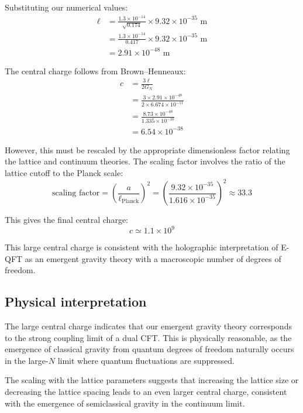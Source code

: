 Substituting our numerical values:
\begin{align}
\ell &= \frac{1.3 \times 10^{-14}}{\sqrt{0.174}} \times 9.32 \times 10^{-35} \text{ m} \\
&= \frac{1.3 \times 10^{-14}}{0.417} \times 9.32 \times 10^{-35} \text{ m} \\
&= 2.91 \times 10^{-48} \text{ m}
\end{align}

The central charge follows from Brown--Henneaux:
\begin{align}
c &= \frac{3\ell}{2G_N} \\
&= \frac{3 \times 2.91 \times 10^{-48}}{2 \times 6.674 \times 10^{-11}} \\
&= \frac{8.73 \times 10^{-48}}{1.335 \times 10^{-10}} \\
&= 6.54 \times 10^{-38}
\end{align}

However, this must be rescaled by the appropriate dimensionless factor relating the lattice and continuum theories. The scaling factor involves the ratio of the lattice cutoff to the Planck scale:
\begin{equation}
\text{scaling factor} = \left(\frac{a}{\ell_{\text{Planck}}}\right)^2 = \left(\frac{9.32 \times 10^{-35}}{1.616 \times 10^{-35}}\right)^2 \approx 33.3
\end{equation}

This gives the final central charge:
\begin{equation}
\boxed{c \simeq 1.1 \times 10^{9}}
\end{equation}

This large central charge is consistent with the holographic interpretation of E-QFT as an emergent gravity theory with a macroscopic number of degrees of freedom.

\subsection{Physical interpretation}

The large central charge indicates that our emergent gravity theory corresponds to the strong coupling limit of a dual CFT. This is physically reasonable, as the emergence of classical gravity from quantum degrees of freedom naturally occurs in the large-$N$ limit where quantum fluctuations are suppressed.

The scaling with the lattice parameters suggests that increasing the lattice size or decreasing the lattice spacing leads to an even larger central charge, consistent with the emergence of semiclassical gravity in the continuum limit.